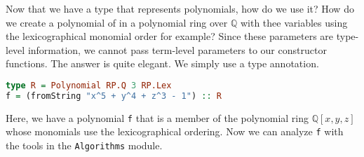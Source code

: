\documentclass[MS, xcolor=dvipsnames]{wfuthesis}
\def\bQ{\mathbb{Q}}
\theoremstyle{definition}
\begin{document}
Now that we have a type that represents polynomials, how do we use it? How do we create a polynomial of in a polynomial ring over $\bQ$ with thee variables using the lexicographical monomial order for example? Since these parameters are type-level information, we cannot pass term-level parameters to our constructor functions. The answer is quite elegant. We simply use a type annotation. 
\begin{lstlisting}[language=Haskell]
type R = Polynomial RP.Q 3 RP.Lex
f = (fromString "x^5 + y^4 + z^3 - 1") :: R
\end{lstlisting}
Here, we have a polynomial \lstinline{f} that is a member of the polynomial ring $\bQ[x,y,z]$ whose monomials use the lexicographical ordering. Now we can analyze \lstinline{f} with the tools in the \lstinline{Algorithms} module. 
\end{document}
